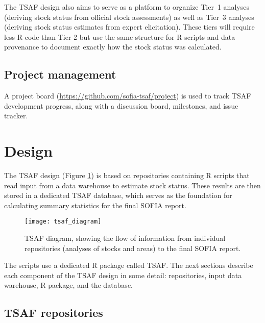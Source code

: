 \documentclass[12pt]{article}
\newcommand\blue[1]{\textcolor{darkblue}{#1}}
\begin{document}
The TSAF design also aims to serve as a platform to organize Tier~1 analyses
(deriving stock status from official stock assessments) as well as Tier~3
analyses (deriving stock status estimates from expert elicitation). These tiers
will require less R code than Tier 2 but use the same structure for R scripts
and data provenance to document exactly how the stock status was calculated.

\subsection{Project management}
\label{subsec:project-board}

A project board (\blue{\url{https://github.com/sofia-tsaf/project}}) is used to
track TSAF development progress, along with a discussion board, milestones, and
issue tracker.


\section{Design}

The TSAF design (Figure \ref{fig:tsaf-diagram}) is based on repositories
containing R scripts that read input from a data warehouse to estimate stock
status. These results are then stored in a dedicated TSAF database, which serves
as the foundation for calculating summary statistics for the final SOFIA report.

\begin{figure}[htb]
  \begin{center}
    \texttt{[image: tsaf\_diagram]}
    \vspace{2ex}
    \caption{TSAF diagram, showing the flow of information from individual
      repositories (analyses of stocks and areas) to the final SOFIA report.}
    \label{fig:tsaf-diagram}
  \end{center}
\end{figure}

The scripts use a dedicated R package called {\sf TSAF}. The next sections
describe each component of the TSAF design in some detail: repositories, input
data warehouse, R package, and the database.

\subsection{TSAF repositories}
\end{document}
